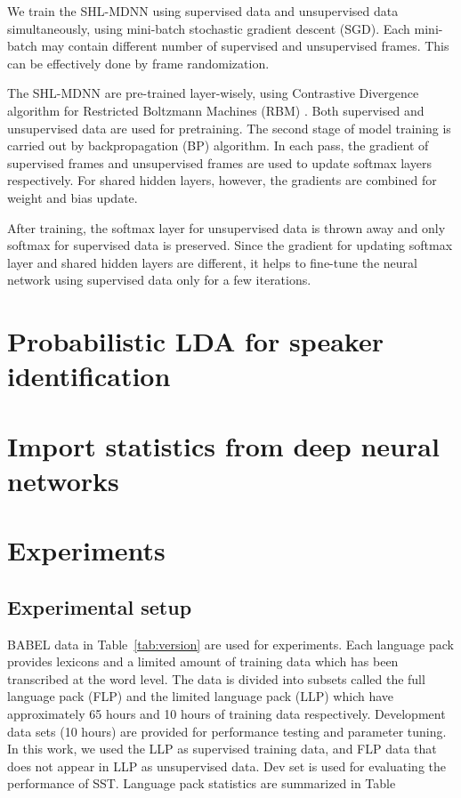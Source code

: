 \documentclass[a4paper]{article}
\begin{document}
We train the SHL-MDNN using supervised data and unsupervised data simultaneously, using mini-batch stochastic 
gradient descent (SGD). Each mini-batch may contain different number of supervised and unsupervised frames. This 
can be effectively done by frame randomization.

The SHL-MDNN are pre-trained layer-wisely, using Contrastive Divergence algorithm for Restricted Boltzmann Machines (RBM) 
\cite{hinton2006fast,mohamed2011deep}. Both supervised and unsupervised data are used for pretraining. The second stage 
of model training is carried out by backpropagation (BP) algorithm. In each pass, the gradient of supervised frames and
unsupervised frames are used to update softmax layers respectively. For shared hidden layers, however, the gradients are 
combined for weight and bias update.

After training, the softmax layer for unsupervised data is thrown away and only softmax for supervised data is preserved.
Since the gradient for updating softmax layer and shared hidden layers are different, it helps to fine-tune the neural network
using supervised data only for a few iterations.


\section{Probabilistic LDA for speaker identification}

\section{Import statistics from deep neural networks}

\section{Experiments}
\subsection{Experimental setup}
\label{sec:setup}
BABEL data in Table~\ref{tab:version} are used for experiments. Each language pack provides lexicons and a 
limited amount of training data which has been transcribed at the word level. The data is divided into 
subsets called the full language pack (FLP) and the limited language pack (LLP) which have approximately 
65 hours and 10 hours of training data respectively. Development data sets (10 hours) are provided for 
performance testing and parameter tuning. In this work, we used the LLP as supervised training data, and
FLP data that does not appear in LLP as unsupervised data. Dev set is used for evaluating the performance
of SST. Language pack statistics are summarized in Table~
\end{document}
